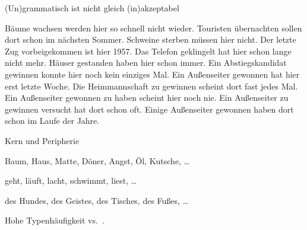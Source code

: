 \begin{frame}
  {(Un)grammatisch ist nicht gleich (in)akzeptabel}
  \pause
  \begin{exe}
    \ex\begin{xlist}
      \ex Bäume wachsen werden hier so schnell nicht wieder.
      \pause
      \ex Touristen übernachten sollen dort schon im nächsten Sommer.
      \pause
      \ex Schweine sterben müssen hier nicht.
      \pause
      \ex Der letzte Zug vorbeigekommen ist hier 1957.
      \pause
      \ex Das Telefon geklingelt hat hier schon lange nicht mehr.
      \pause
      \ex Häuser gestanden haben hier schon immer.
      \pause
      \ex Ein Abstiegskandidat gewinnen konnte hier noch kein einziges Mal.
      \pause
      \ex Ein Außenseiter gewonnen hat hier erst letzte Woche.
      \pause
      \ex Die Heimmannschaft zu gewinnen scheint dort fast jedes Mal.
      \pause
      \ex Ein Außenseiter gewonnen zu haben scheint hier noch nie.
      \pause
      \ex Ein Außenseiter zu gewinnen versucht hat dort schon oft.
      \pause
      \ex Einige Außenseiter gewonnen haben dort schon im Laufe der Jahre.
    \end{xlist}
  \end{exe}
\end{frame}

\begin{frame}
  {Kern und Peripherie}
  \pause
\begin{exe}
  \ex\label{ex:kernundperipherie022}
    \begin{xlist}
      \ex \alert{Baum, Haus, Matte, Döner, Angst, Öl, Kutsche, \ldots}
      \ex {}
    \end{xlist}
    \pause
    \ex
    \begin{xlist}
      \ex \alert{geht, läuft, lacht, schwimmt, liest, \ldots}
      \ex {}
    \end{xlist}
    \pause
    \ex
    \begin{xlist}
      \ex \alert{des Hundes, des Geistes, des Tisches, des Fußes, \ldots}
      \ex {}
    \end{xlist}
  \end{exe}
  \pause
  \vspace{\baselineskip}
  \Large
  \centering
  \alert{Hohe Typenhäufigkeit} vs.\ .  
\end{frame}

